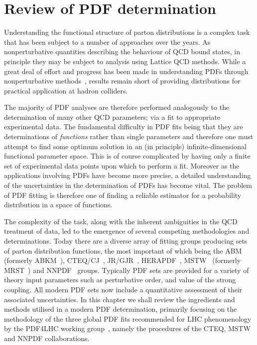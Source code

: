 \chapter{Review of PDF determination}
\label{ch:pdfdet}
Understanding the functional structure of parton distributions is a complex task that has been subject to a number of approaches over the years. As nonperturbative quantities describing the behaviour of QCD bound states, in principle they may be subject to analysis using Lattice QCD methods. While a great deal of effort and progress has been made in understanding PDFs through nonperturbative methods~\cite{Dolgov:2000ca,Horsley:2004uq,Gockeler:2004wp,Schroers:2005rm}, results remain short of providing distributions for practical application at hadron colliders.

The majority of PDF analyses are therefore performed analogously to the determination of many other QCD parameters; via a fit to appropriate experimental data. The fundamental difficulty in PDF fits being that they are determinations of \emph{functions} rather than single parameters and therefore one must attempt to find some optimum solution in an (in principle) infinite-dimensional functional parameter space. This is of course complicated by having only a finite set of experimental data points upon which to perform a fit. Moreover as the applications involving PDFs have become more precise, a detailed understanding of the uncertainties in the determination of PDFs has become vital. The problem of PDF fitting is therefore one of finding a reliable estimator for a probability distribution in a space of functions.

The complexity of the task, along with the inherent ambiguities in the QCD treatment of data, led to the emergence of several competing methodologies and determinations. Today there are a diverse array of fitting groups producing sets of parton distribution functions, the most important of which being the ABM~\cite{Alekhin:2013nda,Alekhin:2012ig} (formerly ABKM~\cite{Alekhin:2009ni}), CTEQ/CJ~\cite{Gao:2013xoa,Lai:2010vv,Nadolsky:2008zw,Owens:2012bv}, JR/GJR~\cite{JimenezDelgado:2008hf,Gluck:2007ck}, HERAPDF~\cite{Aaron:2009aa,::2014uva}, MSTW~\cite{Martin:2009iq,Martin:2012da} (formerly MRST~\cite{Martin:1998sq,Martin:2001es,Martin:2002dr,Martin:2004dh}) and NNPDF~\cite{Ball:2012cx,Ball:2011gg,Ball:2011uy,Ball:2011mu,Ball:2010de,Ball:2008by} groups. Typically PDF sets are provided for a variety of theory input parameters such as perturbative order, and value of the strong coupling. All modern PDF sets now include a quantitative assessment of their associated uncertainties. In this chapter we shall review the ingredients and methods utilised in a modern PDF determination, primarily focusing on the methodology of the three global PDF fits recommended for LHC phenomenology by the PDF4LHC working group~\cite{Botje:2011sn}, namely the procedures of the CTEQ, MSTW and NNPDF collaborations.

